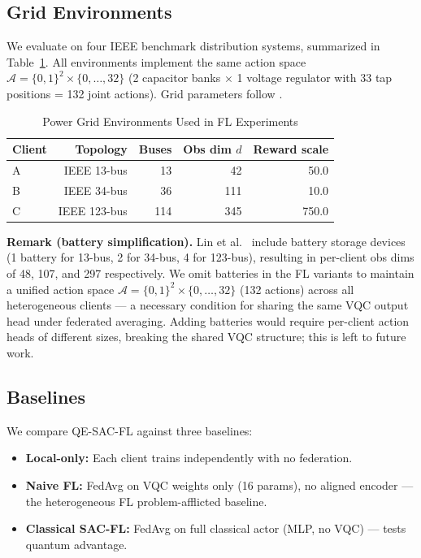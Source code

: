 \documentclass[journal]{IEEEtran}
\begin{document}
\subsection{Grid Environments}

We evaluate on four IEEE benchmark distribution systems, summarized in
Table~\ref{tab:envs}. All environments implement the same action space
$\mathcal{A} = \{0,1\}^2 \times \{0,\ldots,32\}$ (2 capacitor banks
$\times$ 1 voltage regulator with 33 tap positions = 132 joint actions).
Grid parameters follow \cite{lin2025qesac}.

\begin{table}[t]
\centering
\caption{Power Grid Environments Used in FL Experiments}
\label{tab:envs}
\begin{tabular}{lrrrr}
\toprule
Client & Topology & Buses & Obs dim $d$ & Reward scale \\
\midrule
A & IEEE 13-bus  &  13 &  42  & 50.0 \\
B & IEEE 34-bus  &  36 & 111  & 10.0 \\
C & IEEE 123-bus & 114 & 345  & 750.0 \\
\bottomrule
\end{tabular}
\end{table}

\noindent\textbf{Remark (battery simplification).}
Lin et al.\ \cite{lin2025qesac} include battery storage devices
(1 battery for 13-bus, 2 for 34-bus, 4 for 123-bus), resulting in
per-client obs dims of 48, 107, and 297 respectively.
We omit batteries in the FL variants to maintain a unified action space
$\mathcal{A} = \{0,1\}^2 \times \{0,\ldots,32\}$ (132 actions) across
all heterogeneous clients --- a necessary condition for sharing the same
VQC output head under federated averaging.
Adding batteries would require per-client action heads of different sizes,
breaking the shared VQC structure; this is left to future work.

\subsection{Baselines}

We compare QE-SAC-FL against three baselines:

\begin{itemize}
    \item \textbf{Local-only:} Each client trains independently with no federation.
    \item \textbf{Naive FL:} FedAvg on VQC weights only (16 params), no aligned encoder --- the heterogeneous FL problem-afflicted baseline.
    \item \textbf{Classical SAC-FL:} FedAvg on full classical actor (MLP, no VQC) --- tests quantum advantage.
\end{itemize}
\end{document}
